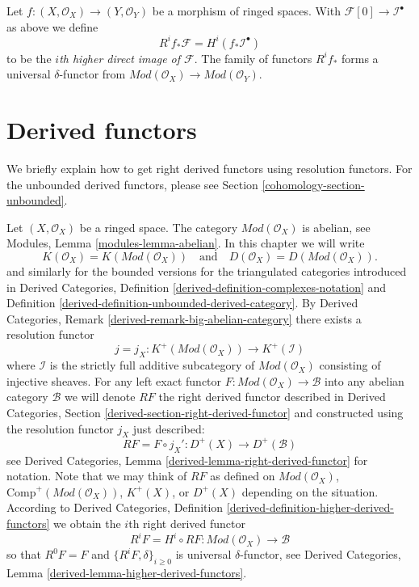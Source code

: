 \medskip\noindent
Let $f : (X, \mathcal{O}_X) \to (Y, \mathcal{O}_Y)$ be a morphism of ringed
spaces. With $\mathcal{F}[0] \to \mathcal{I}^\bullet$ as above
we define
\begin{equation}
\label{equation-higher-direct-image-modules}
R^if_*\mathcal{F} = H^i(f_*\mathcal{I}^\bullet)
\end{equation}
to be the {\it $i$th higher direct image of $\mathcal{F}$}.
The family of functors $R^if_*$ forms a universal $\delta$-functor
from $\textit{Mod}(\mathcal{O}_X) \to \textit{Mod}(\mathcal{O}_Y)$.

\section{Derived functors}
\label{cohomology-section-derived-functors}
We briefly explain how to get right derived functors using resolution
functors. For the unbounded derived functors, please see
Section \ref{cohomology-section-unbounded}.

\medskip\noindent
Let $(X, \mathcal{O}_X)$ be a ringed space. The category
$\textit{Mod}(\mathcal{O}_X)$ is abelian, see
Modules, Lemma \ref{modules-lemma-abelian}.
In this chapter we will write
$$
K(\mathcal{O}_X) = K(\textit{Mod}(\mathcal{O}_X))
\quad
\text{and}
\quad
D(\mathcal{O}_X) = D(\textit{Mod}(\mathcal{O}_X)).
$$
and similarly for the bounded versions for the triangulated categories
introduced in
Derived Categories, Definition \ref{derived-definition-complexes-notation} and
Definition \ref{derived-definition-unbounded-derived-category}.
By
Derived Categories, Remark \ref{derived-remark-big-abelian-category}
there exists a resolution functor
$$
j = j_X :
K^{+}(\textit{Mod}(\mathcal{O}_X))
\longrightarrow
K^{+}(\mathcal{I})
$$
where $\mathcal{I}$ is the strictly full additive subcategory of
$\textit{Mod}(\mathcal{O}_X)$ consisting of injective sheaves.
For any left exact functor
$F : \textit{Mod}(\mathcal{O}_X) \to \mathcal{B}$
into any abelian category $\mathcal{B}$ we will denote $RF$ the
right derived functor described in
Derived Categories, Section \ref{derived-section-right-derived-functor}
and constructed using the resolution functor $j_X$ just described:
\begin{equation}
\label{equation-RF}
RF = F \circ j_X' : D^{+}(X) \longrightarrow D^{+}(\mathcal{B})
\end{equation}
see
Derived Categories, Lemma \ref{derived-lemma-right-derived-functor}
for notation. Note that we may think of $RF$ as defined on
$\textit{Mod}(\mathcal{O}_X)$,
$\text{Comp}^{+}(\textit{Mod}(\mathcal{O}_X))$,
$K^{+}(X)$, or $D^{+}(X)$
depending on the situation. According to
Derived Categories, Definition \ref{derived-definition-higher-derived-functors}
we obtain the $i$th right derived functor
\begin{equation}
\label{equation-RFi}
R^iF = H^i \circ RF : \textit{Mod}(\mathcal{O}_X) \longrightarrow \mathcal{B}
\end{equation}
so that $R^0F = F$ and $\{R^iF, \delta\}_{i \geq 0}$ is universal
$\delta$-functor, see
Derived Categories, Lemma \ref{derived-lemma-higher-derived-functors}.

